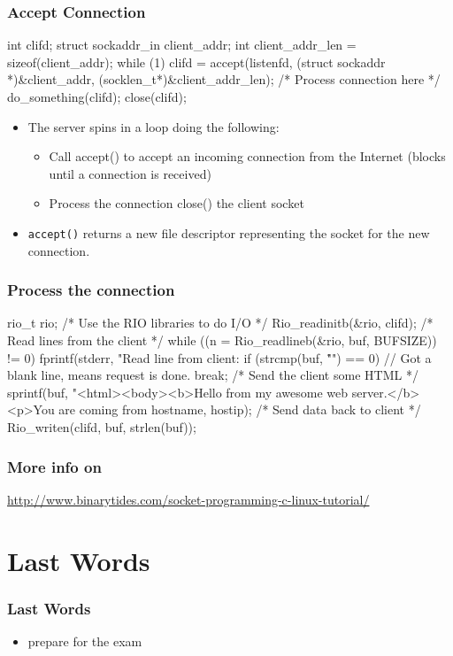 \documentclass[newPxFont,sthlmFooter,nooffset]{beamer}
\begin{document}
\begin{frame}[t, fragile]
  \frametitle{Accept Connection}
\begin{codedefnb}
int clifd;
struct sockaddr_in client_addr;
int client_addr_len = sizeof(client_addr);
while (1) {
     clifd = accept(listenfd,
     (struct sockaddr *)&client_addr,
                   (socklen_t*)&client_addr_len);
     /* Process connection here */
     do_something(clifd);
     close(clifd);
}
\end{codedefnb}
\begin{itemize}
\item The server spins in a loop doing the following:
  \begin{itemize}
  \item Call accept() to accept an incoming connection from the
    Internet (blocks until a connection is received)
  \item Process the connection close() the client socket
  \end{itemize}
\item \texttt{accept()} returns a new file descriptor representing the socket for the new connection.
\end{itemize}
\end{frame}


\begin{frame}[t, fragile]
  \frametitle{Process the connection}
\begin{codedefnb}
rio_t rio; /* Use the RIO libraries to do I/O */
    Rio_readinitb(&rio, clifd);
/* Read lines from the client */
while ((n = Rio_readlineb(&rio, buf, BUFSIZE)) != 0) {
      fprintf(stderr, "Read line from client: %
      if (strcmp(buf, "\r\n") == 0) {
        // Got a blank line, means request is done.
break; }
}
    /* Send the client some HTML */
    sprintf(buf, "<html><body><b>Hello from my awesome web server.</b><p>You are
coming from %
     hostname, hostip);
    /* Send data back to client */
Rio_writen(clifd, buf, strlen(buf));
\end{codedefnb}
\end{frame}


\begin{frame}[t, fragile]
  \frametitle{More info on}

\url{http://www.binarytides.com/socket-programming-c-linux-tutorial/}
\end{frame}


\section{Last Words}

\begin{frame}[t]
  \frametitle{Last Words}

\begin{itemize}
\item prepare for the exam
\end{itemize}
\end{frame}
\end{document}
